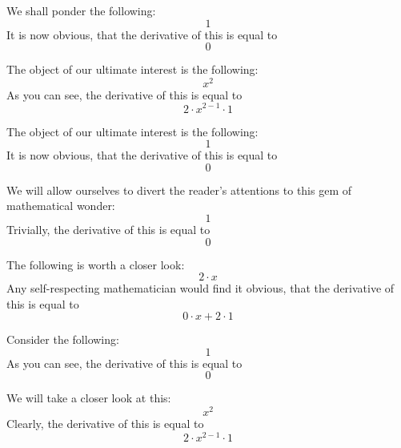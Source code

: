 \documentclass{article}
\begin{document}
We shall ponder the following:
\begin{equation}
1 
\end{equation}
It is now obvious, that the derivative of this is equal to
\begin{equation}
0 
\end{equation}

The object of our ultimate interest is the following:
\begin{equation}
x ^{2 } 
\end{equation}
As you can see, the derivative of this is equal to
\begin{equation}
2 \cdot x ^{2 - 1 } \cdot 1 
\end{equation}

The object of our ultimate interest is the following:
\begin{equation}
1 
\end{equation}
It is now obvious, that the derivative of this is equal to
\begin{equation}
0 
\end{equation}

We will allow ourselves to divert the reader's attentions to this gem of mathematical wonder:
\begin{equation}
1 
\end{equation}
Trivially, the derivative of this is equal to
\begin{equation}
0 
\end{equation}

The following is worth a closer look:
\begin{equation}
2 \cdot x 
\end{equation}
Any self-respecting mathematician would find it obvious, that the derivative of this is equal to
\begin{equation}
0 \cdot x + 2 \cdot 1 
\end{equation}

Consider the following:
\begin{equation}
1 
\end{equation}
As you can see, the derivative of this is equal to
\begin{equation}
0 
\end{equation}

We will take a closer look at this:
\begin{equation}
x ^{2 } 
\end{equation}
Clearly, the derivative of this is equal to
\begin{equation}
2 \cdot x ^{2 - 1 } \cdot 1 
\end{equation}
\end{document}
